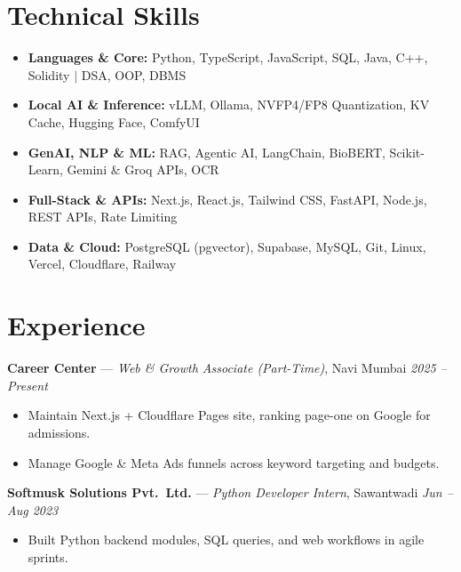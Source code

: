 \documentclass[a4paper,11pt]{article}
\newcommand{\resumeItemListStart}{\begin{itemize}[leftmargin=0.14in,label=\textbullet,topsep=2pt plus 1pt,itemsep=2pt plus 1pt,parsep=0pt]}
\newcommand{\resumeItemListEnd}{\end{itemize}}
\newcommand{\resumeSkillListStart}{\begin{itemize}[leftmargin=0.14in,label=\textbullet,topsep=2pt plus 1pt,itemsep=2pt plus 1pt,parsep=0pt]}
\newcommand{\resumeSkillListEnd}{\end{itemize}}
\begin{document}
\section{Technical Skills}
\resumeSkillListStart
  \item \textbf{Languages \& Core:} Python, TypeScript, JavaScript, SQL, Java, C++, Solidity $|$ DSA, OOP, DBMS
  \item \textbf{Local AI \& Inference:} vLLM, Ollama, NVFP4/FP8 Quantization, KV Cache, Hugging Face, ComfyUI
  \item \textbf{GenAI, NLP \& ML:} RAG, Agentic AI, LangChain, BioBERT, Scikit-Learn, Gemini \& Groq APIs, OCR
  \item \textbf{Full-Stack \& APIs:} Next.js, React.js, Tailwind CSS, FastAPI, Node.js, REST APIs, Rate Limiting
  \item \textbf{Data \& Cloud:} PostgreSQL (pgvector), Supabase, MySQL, Git, Linux, Vercel, Cloudflare, Railway
\resumeSkillListEnd

\section{Experience}
\noindent\textbf{Career Center} --- \textit{Web \& Growth Associate (Part-Time)}, Navi Mumbai \hfill \textit{2025 -- Present}
\resumeItemListStart
  \item Maintain Next.js + Cloudflare Pages site, ranking page-one on Google for admissions.
  \item Manage Google \& Meta Ads funnels across keyword targeting and budgets.
\resumeItemListEnd
\vspace{3.5pt plus 1.5pt minus 1pt}
\noindent\textbf{Softmusk Solutions Pvt.\ Ltd.} --- \textit{Python Developer Intern}, Sawantwadi \hfill \textit{Jun -- Aug 2023}
\resumeItemListStart
  \item Built Python backend modules, SQL queries, and web workflows in agile sprints.
\resumeItemListEnd

\end{document}
